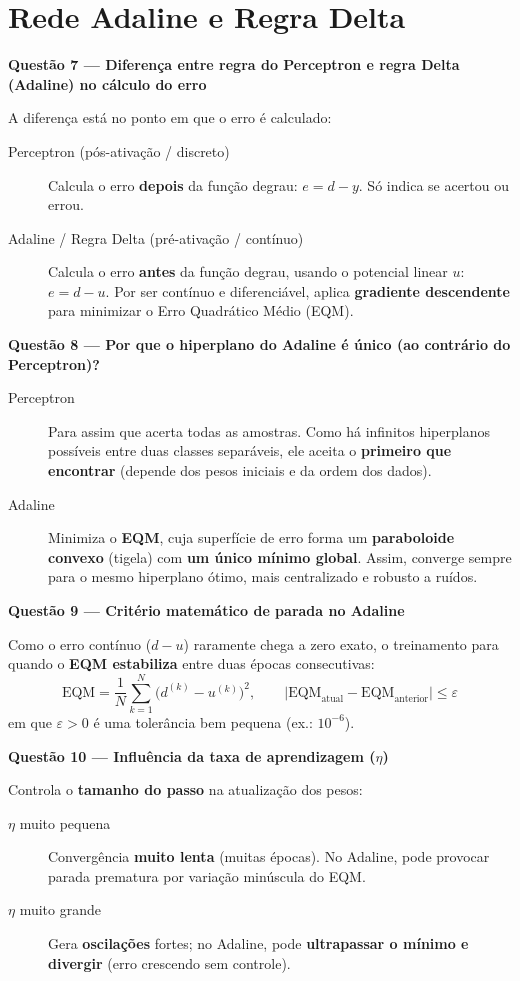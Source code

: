 \documentclass[10pt,a4paper]{article}
\newcommand{\questao}[2]{%
  \needspace{4\baselineskip}%
  \vspace{0.45em}\noindent
  {\color{azulufersa}\bfseries Questão #1 --- #2}\par\nopagebreak\vspace{0.15em}\noindent\ignorespaces%
}
\begin{document}
\section{Rede Adaline e Regra Delta}

\questao{7}{Diferença entre regra do Perceptron e regra Delta (Adaline) no cálculo do erro}
A diferença está no ponto em que o erro é calculado:
\begin{description}
  \item[Perceptron (pós-ativação / discreto)] Calcula o erro \textbf{depois} da função degrau: $e = d - y$. Só indica se acertou ou errou.
  \item[Adaline / Regra Delta (pré-ativação / contínuo)] Calcula o erro \textbf{antes} da função degrau, usando o potencial linear $u$: $e = d - u$. Por ser contínuo e diferenciável, aplica \textbf{gradiente descendente} para minimizar o Erro Quadrático Médio (EQM).
\end{description}

\questao{8}{Por que o hiperplano do Adaline é único (ao contrário do Perceptron)?}
\begin{description}
  \item[Perceptron] Para assim que acerta todas as amostras. Como há infinitos hiperplanos possíveis entre duas classes separáveis, ele aceita o \textbf{primeiro que encontrar} (depende dos pesos iniciais e da ordem dos dados).
  \item[Adaline] Minimiza o \textbf{EQM}, cuja superfície de erro forma um \textbf{paraboloide convexo} (tigela) com \textbf{um único mínimo global}. Assim, converge sempre para o mesmo hiperplano ótimo, mais centralizado e robusto a ruídos.
\end{description}

\questao{9}{Critério matemático de parada no Adaline}
Como o erro contínuo ($d - u$) raramente chega a zero exato, o treinamento para quando o \textbf{EQM estabiliza} entre duas épocas consecutivas:
\[
  \mathrm{EQM} = \frac{1}{N}\sum_{k=1}^{N}\bigl(d^{(k)} - u^{(k)}\bigr)^2,
  \qquad
  \bigl|\mathrm{EQM}_{\text{atual}} - \mathrm{EQM}_{\text{anterior}}\bigr| \le \varepsilon
\]
em que $\varepsilon > 0$ é uma tolerância bem pequena (ex.: $10^{-6}$).

\questao{10}{Influência da taxa de aprendizagem ($\eta$)}
Controla o \textbf{tamanho do passo} na atualização dos pesos:
\begin{description}
  \item[$\eta$ muito pequena] Convergência \textbf{muito lenta} (muitas épocas). No Adaline, pode provocar parada prematura por variação minúscula do EQM.
  \item[$\eta$ muito grande] Gera \textbf{oscilações} fortes; no Adaline, pode \textbf{ultrapassar o mínimo e divergir} (erro crescendo sem controle).
\end{description}
\end{document}
